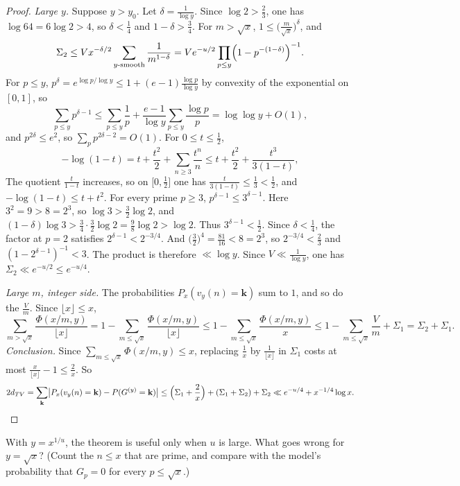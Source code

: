 \begin{proof}
\emph{Large $y$.} Suppose $y>y_0$. Let $\delta=\frac1{\log y}$. Since $\log2>\frac23$, one has $\log64=6\log2>4$, so $\delta<\frac14$ and $1-\delta>\frac34$. For $m>\sqrt x$, $1\le\bigl(\frac m{\sqrt x}\bigr)^\delta$, and
\[
\Sigma_2\le Vx^{-\delta/2}\sum_{y\text{-smooth}}\frac1{m^{1-\delta}}=Ve^{-u/2}\prod_{p\le y}\Bigl(1-p^{-(1-\delta)}\Bigr)^{-1}.
\]
For $p\le y$, $p^\delta=e^{\log p/\log y}\le1+(e-1)\frac{\log p}{\log y}$ by convexity of the exponential on $[0,1]$, so
\[
\sum_{p\le y}p^{\delta-1}\le\sum_{p\le y}\frac1p+\frac{e-1}{\log y}\sum_{p\le y}\frac{\log p}p=\log\log y+O(1),
\]
and $p^{2\delta}\le e^2$, so $\sum_pp^{2\delta-2}=O(1)$. For $0\le t\le\frac12$,
\[
-\log(1-t)=t+\frac{t^2}2+\sum_{n\ge3}\frac{t^n}n\le t+\frac{t^2}2+\frac{t^3}{3(1-t)},
\]
The quotient $\frac t{1-t}$ increases, so on $\bigl[0,\frac12\bigr]$ one has $\frac t{3(1-t)}\le\frac13<\frac12$, and $-\log(1-t)\le t+t^2$. For every prime $p\ge3$, $p^{\delta-1}\le3^{\delta-1}$. Here $3^2=9>8=2^3$, so $\log3>\frac32\log2$, and $(1-\delta)\log3>\frac34\cdot\frac32\log2=\frac98\log2>\log2$. Thus $3^{\delta-1}<\frac12$. Since $\delta<\frac14$, the factor at $p=2$ satisfies $2^{\delta-1}<2^{-3/4}$. And $\bigl(\frac32\bigr)^4=\frac{81}{16}<8=2^3$, so $2^{-3/4}<\frac23$ and $(1-2^{\delta-1})^{-1}<3$. The product is therefore $\ll\log y$. Since $V\ll\frac1{\log y}$, one has $\Sigma_2\ll e^{-u/2}\le e^{-u/4}$.

\emph{Large $m$, integer side.} The probabilities $P_x(v_y(n)=\mathbf k)$ sum to $1$, and so do the $\frac Vm$. Since $\lfloor x\rfloor\le x$,
\[
\sum_{m>\sqrt x}\frac{\Phi(x/m,y)}{\lfloor x\rfloor}=1-\sum_{m\le\sqrt x}\frac{\Phi(x/m,y)}{\lfloor x\rfloor}\le1-\sum_{m\le\sqrt x}\frac{\Phi(x/m,y)}x\le1-\sum_{m\le\sqrt x}\frac Vm+\Sigma_1=\Sigma_2+\Sigma_1.
\]
\emph{Conclusion.} Since $\sum_{m\le\sqrt x}\Phi(x/m,y)\le x$, replacing $\frac1x$ by $\frac1{\lfloor x\rfloor}$ in $\Sigma_1$ costs at most $\frac x{\lfloor x\rfloor}-1\le\frac2x$. So
\[
2d_{TV}=\sum_{\mathbf k}\bigl|P_x(v_y(n)=\mathbf k)-P(G^{(y)}=\mathbf k)\bigr|\le\Bigl(\Sigma_1+\frac2x\Bigr)+(\Sigma_1+\Sigma_2)+\Sigma_2\ll e^{-u/4}+x^{-1/4}\log x.
\]
\end{proof}

\begin{think}
With $y=x^{1/u}$, the theorem is useful only when $u$ is large. What goes wrong for $y=\sqrt x$? (Count the $n\le x$ that are prime, and compare with the model's probability that $G_p=0$ for every $p\le\sqrt x$.)
\end{think}

